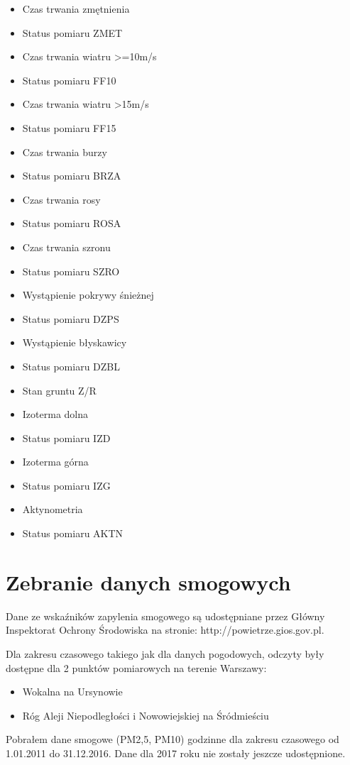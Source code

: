 \documentclass[a4paper,12pt,twoside,openany]{report}
\begin{document}
\begin{itemize}
	\item Czas trwania zmętnienia
	\item Status pomiaru ZMET
	\item Czas trwania wiatru >=10m/s
	\item Status pomiaru FF10
	\item Czas trwania wiatru >15m/s
	\item Status pomiaru FF15
	\item Czas trwania burzy
	\item Status pomiaru BRZA
	\item Czas trwania rosy
	\item Status pomiaru ROSA
	\item Czas trwania szronu
	\item Status pomiaru SZRO
	\item Wystąpienie pokrywy śnieżnej
	\item Status pomiaru DZPS
	\item Wystąpienie błyskawicy
	\item Status pomiaru DZBL
	\item Stan gruntu Z/R
	\item Izoterma dolna
	\item Status pomiaru IZD
	\item Izoterma górna
	\item Status pomiaru IZG
	\item Aktynometria
	\item Status pomiaru AKTN
\end{itemize}

\section{Zebranie danych smogowych}

Dane ze wskaźników zapylenia smogowego są udostępniane przez Główny Inspektorat Ochrony Środowiska na stronie: http://powietrze.gios.gov.pl.

Dla zakresu czasowego takiego jak dla danych pogodowych, odczyty były dostępne dla 2 punktów pomiarowych na terenie Warszawy:

\begin{itemize}
	\item Wokalna na Ursynowie
	\item Róg Aleji Niepodległości i Nowowiejskiej na Śródmieściu
\end{itemize}

Pobrałem dane smogowe (PM2,5, PM10) godzinne dla zakresu czasowego od 1.01.2011 do 31.12.2016. Dane dla 2017 roku nie zostały jeszcze udostępnione.
\end{document}
